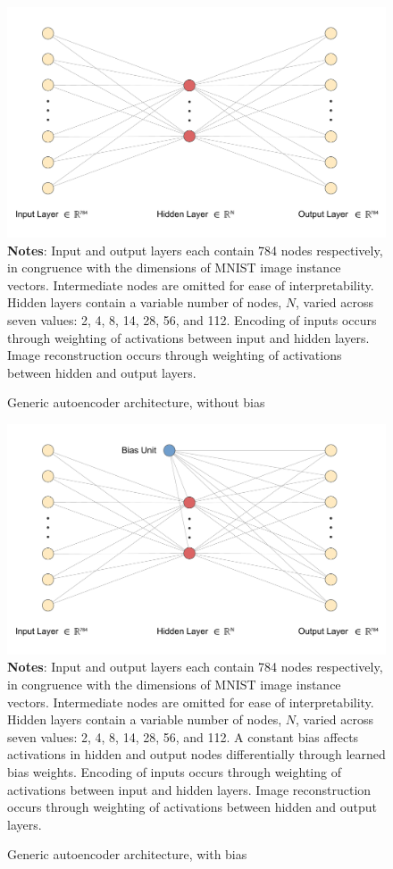 \begin{figure}
    \caption{Generic autoencoder architecture, without bias}
	\label{fig:autoencoder-diagram}
	\includegraphics[width=1.0\textwidth]{graphics/autoencoder_diagram.pdf}
    \textbf{Notes}: Input and output layers each contain 784 nodes respectively, in congruence with the dimensions of MNIST image instance vectors. Intermediate nodes are omitted for ease of interpretability. Hidden layers contain a variable number of nodes, $N$, varied across seven values: 2, 4, 8, 14, 28, 56, and 112. Encoding of inputs occurs through weighting of activations between input and hidden layers. Image reconstruction occurs through weighting of activations between hidden and output layers.
\end{figure}

\begin{figure}
    \caption{Generic autoencoder architecture, with bias}
	\label{fig:autoencoder-diagram-bias}
	\includegraphics[width=1.0\textwidth]{graphics/autoencoder_diagram_bias.pdf}
    \textbf{Notes}: Input and output layers each contain 784 nodes respectively, in congruence with the dimensions of MNIST image instance vectors. Intermediate nodes are omitted for ease of interpretability. Hidden layers contain a variable number of nodes, $N$, varied across seven values: 2, 4, 8, 14, 28, 56, and 112. A  constant bias affects activations in hidden and output nodes differentially through learned bias weights. Encoding of inputs occurs through weighting of activations between input and hidden layers. Image reconstruction occurs through weighting of activations between hidden and output layers. 
\end{figure}

